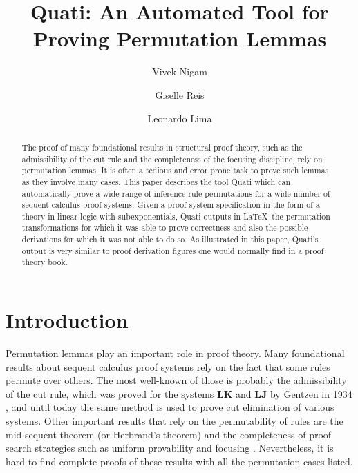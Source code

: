 \documentclass{llncs}
\title{Quati: An Automated Tool for Proving Permutation Lemmas}
\author{Vivek Nigam\inst{1} \and Giselle Reis\inst{2} \and Leonardo Lima\inst{1}}
\institute{Universidade Federal da Para\'{i}ba, Brazil
\and Technische Universit\"{a}t Wien, Austria
}
\begin{document}
\maketitle

\begin{abstract}
The proof of many foundational results in structural proof theory, such as the
admissibility of the cut rule and the completeness of the focusing discipline,
rely on permutation lemmas. It is often a tedious and error prone task to prove
such lemmas as they involve many cases. This paper describes the tool Quati
which can automatically prove
a wide range of inference rule
permutations for a wide number of sequent calculus proof systems. Given a proof system
specification in the form of a theory in linear logic with subexponentials,
Quati outputs in \LaTeX\ the permutation transformations for which it was able
to prove correctness and also the 
possible derivations for which it was not able to do so. As illustrated in this
paper, Quati's output is very similar to proof derivation figures one would
normally find in a proof theory book. 
\end{abstract}

\section{Introduction}

Permutation lemmas play an important role in proof theory. Many foundational
results about sequent calculus proof systems rely on the fact that some rules
permute over others. The most well-known of those is probably the admissibility of
the cut rule, which was proved for the systems \textbf{LK} and \textbf{LJ} by
Gentzen in 1934 \cite{gentzen}, and until today the same method is used to prove
cut elimination of various systems. Other important results that rely on the
permutability of rules are the mid-sequent theorem (or Herbrand's theorem)
\cite{herbrand} and the completeness of proof search strategies such as uniform
provability \cite{} and focusing \cite{andreoli}. Nevertheless, it is hard to
find complete proofs of these results with all the permutation cases listed.
\end{document}
